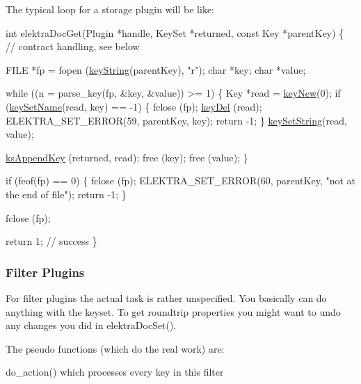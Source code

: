 The typical loop for a storage plugin will be like\-: 
\begin{DoxyCode}
\textcolor{keywordtype}{int} elektraDocGet(Plugin *handle, KeySet *returned, \textcolor{keyword}{const} Key *parentKey)
\{
        \textcolor{comment}{// contract handling, see below}

        FILE *fp = fopen (\hyperlink{group__keyvalue_ga880936f2481d28e6e2acbe7486a21d05}{keyString}(parentKey), \textcolor{stringliteral}{"r"});
        \textcolor{keywordtype}{char} *key;
        \textcolor{keywordtype}{char} *value;

        \textcolor{keywordflow}{while} ((n = parse\_key(fp, &key, &value)) >= 1)
        \{
                Key *read = \hyperlink{group__key_gad23c65b44bf48d773759e1f9a4d43b89}{keyNew}(0);
                \textcolor{keywordflow}{if} (\hyperlink{group__keyname_ga7699091610e7f3f43d2949514a4b35d9}{keySetName}(read, key) == -1)
                \{
                        fclose (fp);
                        \hyperlink{group__key_ga3df95bbc2494e3e6703ece5639be5bb1}{keyDel} (read);
                        ELEKTRA\_SET\_ERROR(59, parentKey, key);
                        \textcolor{keywordflow}{return} -1;
                \}
                \hyperlink{group__keyvalue_ga622bde1eb0e0c4994728331326340ef2}{keySetString}(read, value);

                \hyperlink{group__keyset_gaa5a1d467a4d71041edce68ea7748ce45}{ksAppendKey} (returned, read);
                free (key);
                free (value);
        \}

        \textcolor{keywordflow}{if} (feof(fp) == 0)
        \{
                fclose (fp);
                ELEKTRA\_SET\_ERROR(60, parentKey, \textcolor{stringliteral}{"not at the end of file"});
                \textcolor{keywordflow}{return} -1;
        \}

        fclose (fp);

        \textcolor{keywordflow}{return} 1; \textcolor{comment}{// success}
\}
\end{DoxyCode}
\hypertarget{group__plugin_filter}{}\subsubsection{Filter Plugins}\label{group__plugin_filter}
For filter plugins the actual task is rather unspecified. You basically can do anything with the keyset. To get roundtrip properties you might want to undo any changes you did in elektra\-Doc\-Set().

The pseudo functions (which do the real work) are\-:
\begin{DoxyItemize}
\item do\-\_\-action() which processes every key in this filter
\end{DoxyItemize}


